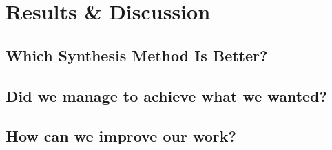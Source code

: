 \chapter{Results \& Discussion}\label{ch:results}
\mbox{}\par 

\section{Which Synthesis Method Is Better?}

\section{Did we manage to achieve what we wanted?}

\section{How can we improve our work?}